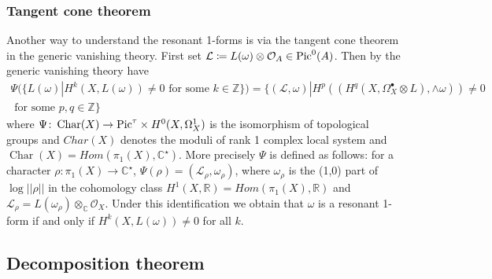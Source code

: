 \documentclass[11pt,reqno]{amsart}
\theoremstyle{definition}
\theoremstyle{remark}
\theoremstyle{cited}
\theoremstyle{citeddef}
\DeclareMathOperator{\Char}{Char}
\def\Pic{{\rm Pic}}
\newcommand{\sL}{\mathcal{L}}
\newcommand{\sM}{\mathcal{M}}
\newcommand{\sO}{\mathcal{O}}
\newcommand{\sR}{\mathcal{R}}
\newcommand{\bbC}{\mathbb{C}}
\newcommand{\bbR}{\mathbb{R}}
\newcommand{\bbZ}{\mathbb{Z}}
\begin{document}
\subsubsection{Tangent cone theorem}
\label{sub:tc} Another way to understand the resonant 1-forms is via the tangent cone theorem in the
generic vanishing theory. 
First set $\sL \coloneqq L(\omega)\otimes \sO_A \in \Pic^0(A)$. 
Then by the generic vanishing theory \cite[Theorem 3]{Ara} have 
\begin{equation}\begin{split}
\Psi(\{L(\omega)| H^k(X, L(\omega))\neq 0 \text{ for some } k\in \bbZ\})
=\{(\sL,\omega)| H^p((H^q(X,\Omega_X^{\bullet}\otimes L),\wedge\omega)) \neq 0
\\ \text{ for some } p,q\in\bbZ\}
\end{split}\label{eq:}
\end{equation}
where $\Psi \colon\Char(X) \to \Pic^{\tau}\times H^0(X,\Omega_X^1)$ 
is the isomorphism of topological groups and $Char(X)$ denotes the moduli
of rank 1 complex local system and $\Char(X) = Hom(\pi_1(X),\bbC^{\star})$. More precisely $\Psi$ is defined
as follows: for a character $\rho\colon \pi_1(X)\to \bbC^{\star}$, $\Psi(\rho) = (\sL_{\rho} , \omega_{\rho})$, where 
$\omega_\rho$ is the (1,0) part of $\log ||\rho||$ in the cohomology class $H^1(X, \bbR) = Hom(\pi_1(X), \bbR)$ and
$\sL_{\rho} = L(\omega_{\rho})\otimes_{\bbC}\sO_X$.
Under this identification we obtain that $\omega$ is a resonant 1-form if and only if $H^k(X, L(\omega))\neq 0$ for all $k$. 


\subsection{Decomposition theorem}
\end{document}
